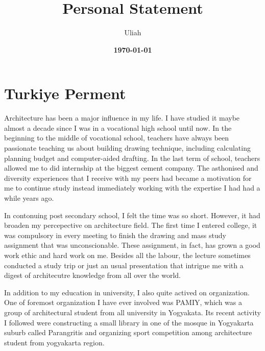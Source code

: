 \documentclass[../main.tex]{subfiles}
\title{
\textbf{Personal Statement} \\
} %
\date{\textbf{\today}}
\author{Uliah}
\begin{document}


\section{Turkiye Perment}

Architecture has been a major influence in my life.
I have studied it maybe almost a decade since I was in a vocational high school until now.
In the beginning to the middle of vocational school, teachers have always been passionate teaching us about building drawing technique, including calculating planning budget and computer-aided drafting.
In the last term of school, teachers allowed me to did internship at the biggest cement company.
The asthonised and diversity experiences that I receive with my peers had became a motivation for me to continue study instead immediately working with the expertise I had had a while years ago.

In contonuing post secondary school, I felt the time was so short. However, it had broaden my percepective on architecture field.
The first time I entered college, it was compulsory in every meeting to finish the drawing and mass study assignment that was unconscionable.
These assignment, in fact, has grown a good work ethic and hard work on me.
Besides all the labour, the lecture sometimes conducted a study trip or just an usual presentation that intrigue me with a digest of architecutre knowledge from all over the world.

In addition to my education in university, I also quite actived on organization. One of foremost organization I have ever involved was PAMIY, which was a group of architectural student from all university in Yogyakata. Its recent activity I followed were constructing a small library in one of the mosque in Yogyakarta suburb called Parangritis and organizing sport competition among architecture student from yogyakarta region.
\end{document}
